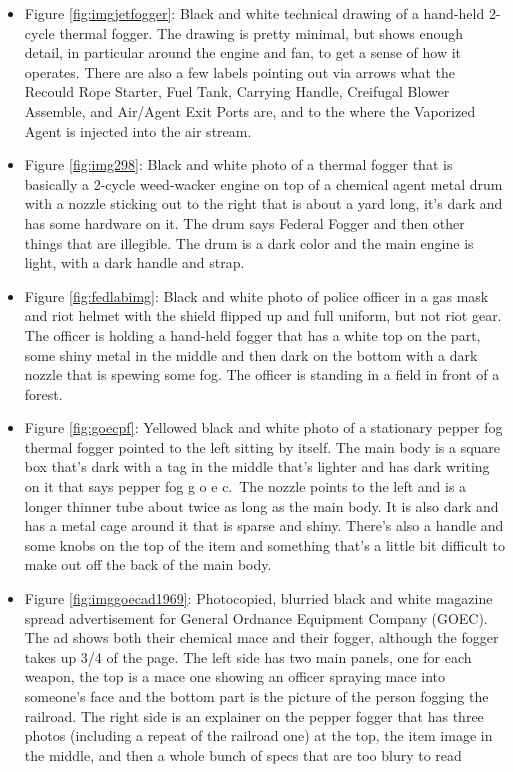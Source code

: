 \documentclass[
  11pt,
]{krantz}
\begin{document}
\begin{itemize}
\item
  Figure \ref{fig:imgjetfogger}: Black and white technical drawing of a hand-held 2-cycle thermal fogger. The drawing is pretty minimal, but shows enough detail, in particular around the engine and fan, to get a sense of how it operates. There are also a few labels pointing out via arrows what the Recould Rope Starter, Fuel Tank, Carrying Handle, Creifugal Blower Assemble, and Air/Agent Exit Ports are, and to the where the Vaporized Agent is injected into the air stream.
\item
  Figure \ref{fig:img298}: Black and white photo of a thermal fogger that is basically a 2-cycle weed-wacker engine on top of a chemical agent metal drum with a nozzle sticking out to the right that is about a yard long, it's dark and has some hardware on it. The drum says Federal Fogger and then other things that are illegible. The drum is a dark color and the main engine is light, with a dark handle and strap.
\item
  Figure \ref{fig:fedlabimg}: Black and white photo of police officer in a gas mask and riot helmet with the shield flipped up and full uniform, but not riot gear. The officer is holding a hand-held fogger that has a white top on the part, some shiny metal in the middle and then dark on the bottom with a dark nozzle that is spewing some fog. The officer is standing in a field in front of a forest.
\item
  Figure \ref{fig:goecpf}: Yellowed black and white photo of a stationary pepper fog thermal fogger pointed to the left sitting by itself. The main body is a square box that's dark with a tag in the middle that's lighter and has dark writing on it that says pepper fog g o e c.~The nozzle points to the left and is a longer thinner tube about twice as long as the main body. It is also dark and has a metal cage around it that is sparse and shiny. There's also a handle and some knobs on the top of the item and something that's a little bit difficult to make out off the back of the main body.
\item
  Figure \ref{fig:imggoecad1969}: Photocopied, blurried black and white magazine spread advertisement for General Ordnance Equipment Company (GOEC). The ad shows both their chemical mace and their fogger, although the fogger takes up 3/4 of the page. The left side has two main panels, one for each weapon, the top is a mace one showing an officer spraying mace into someone's face and the bottom part is the picture of the person fogging the railroad. The right side is an explainer on the pepper fogger that has three photos (including a repeat of the railroad one) at the top, the item image in the middle, and then a whole bunch of specs that are too blury to read

\end{itemize}
\end{document}
